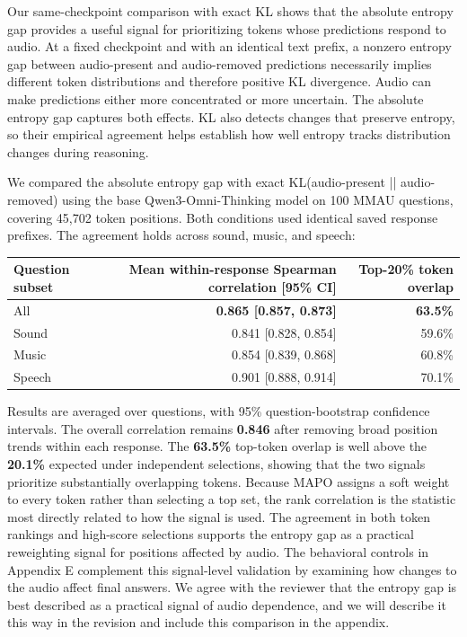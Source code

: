 Our same-checkpoint comparison with exact KL shows that the absolute entropy gap provides a useful signal for prioritizing tokens whose predictions respond to audio. At a fixed checkpoint and with an identical text prefix, a nonzero entropy gap between audio-present and audio-removed predictions necessarily implies different token distributions and therefore positive KL divergence. Audio can make predictions either more concentrated or more uncertain. The absolute entropy gap captures both effects. KL also detects changes that preserve entropy, so their empirical agreement helps establish how well entropy tracks distribution changes during reasoning.

We compared the absolute entropy gap with exact KL(audio-present || audio-removed) using the base Qwen3-Omni-Thinking model on 100 MMAU questions, covering 45,702 token positions. Both conditions used identical saved response prefixes. The agreement holds across sound, music, and speech:

\par\medskip
\begingroup
\small
\setlength{\tabcolsep}{5pt}
\renewcommand{\arraystretch}{1.2}
\noindent\begin{tabularx}{\linewidth}{@{}LRR@{}}
\toprule
\textbf{Question subset} & \textbf{Mean within-response Spearman correlation [95\% CI]} & \textbf{Top-20\% token overlap} \\
\midrule
All & \textbf{0.865 [0.857, 0.873]} & \textbf{63.5\%} \\
Sound & 0.841 [0.828, 0.854] & 59.6\% \\
Music & 0.854 [0.839, 0.868] & 60.8\% \\
Speech & 0.901 [0.888, 0.914] & 70.1\% \\
\bottomrule
\end{tabularx}
\par\endgroup\medskip

Results are averaged over questions, with 95\% question-bootstrap confidence intervals. The overall correlation remains \textbf{0.846} after removing broad position trends within each response. The \textbf{63.5\%} top-token overlap is well above the \textbf{20.1\%} expected under independent selections, showing that the two signals prioritize substantially overlapping tokens. Because MAPO assigns a soft weight to every token rather than selecting a top set, the rank correlation is the statistic most directly related to how the signal is used. The agreement in both token rankings and high-score selections supports the entropy gap as a practical reweighting signal for positions affected by audio. The behavioral controls in Appendix E complement this signal-level validation by examining how changes to the audio affect final answers. We agree with the reviewer that the entropy gap is best described as a practical signal of audio dependence, and we will describe it this way in the revision and include this comparison in the appendix.

